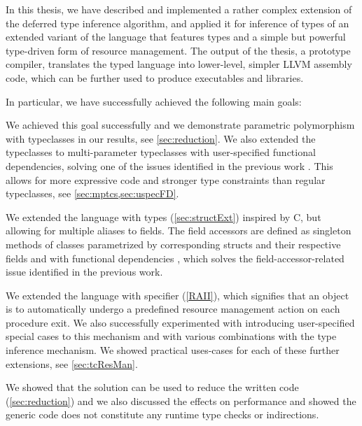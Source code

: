 

In this thesis, we have described and implemented a rather complex extension of the deferred type inference algorithm, and applied it for inference of types of an extended variant of the \cmm language that features types and a simple but powerful type-driven form of resource management. The output of the thesis, a prototype compiler, translates the typed \cmm language into lower-level, simpler LLVM assembly code, which can be further used to produce executables and libraries.

In particular, we have successfully achieved the following main goals:

\begin{description}
    \small
    \item[Extend \cmm with parametric polymorphism with typeclasses] We achieved this goal successfully and we demonstrate parametric polymorphism with typeclasses in our results, see \cref{sec:reduction}. We also extended the typeclasses to multi-parameter typeclasses with user-specified functional dependencies, solving one of the issues identified in the previous work \cite{klepl2020type}. This allows for more expressive code and stronger type constraints than regular typeclasses, see \cref{sec:mptcs,sec:uspecFD}.

    \item[Extend \cmm with record types]  We extended the language with  types (\cref{sec:structExt}) inspired by C, but allowing for multiple aliases to fields. The field accessors are defined as singleton methods of classes parametrized by corresponding structs and their respective fields and with functional dependencies , which solves the field-accessor-related issue identified in the previous work.

    \item[Extend \cmm with automatic resource management features] We extended the language with  specifier (\cref{RAII}), which signifies that an object is to automatically undergo a predefined resource management action on each procedure exit. We also successfully experimented with introducing user-specified special cases to this mechanism and with various combinations with the type inference mechanism. We showed practical uses-cases for each of these further extensions, see \cref{sec:tcResMan}.

    \item[The solution should simplify implementation of low-level software] We showed that the solution can be used to reduce the written code (\cref{sec:reduction}) and we also discussed the effects on performance and showed the generic code does not constitute any runtime type checks or indirections.


\end{description}
